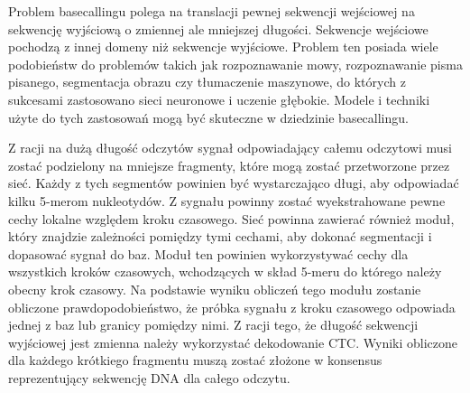\documentclass[a4paper,11pt,twoside]{report}
\theoremstyle{definition}
\begin{document}
Problem basecallingu polega na translacji pewnej sekwencji wejściowej na sekwencję wyjściową o zmiennej ale mniejszej długości. Sekwencje wejściowe pochodzą z innej domeny niż sekwencje wyjściowe. Problem ten posiada wiele podobieństw do problemów takich jak rozpoznawanie mowy, rozpoznawanie pisma pisanego, segmentacja obrazu czy tłumaczenie maszynowe, do których z sukcesami zastosowano sieci neuronowe i uczenie głębokie. Modele i techniki użyte do tych zastosowań mogą być skuteczne w dziedzinie basecallingu.

Z racji na dużą długość odczytów sygnał odpowiadający całemu odczytowi musi zostać podzielony na mniejsze fragmenty, które mogą zostać przetworzone przez sieć. Każdy z tych segmentów powinien być wystarczająco długi, aby odpowiadać kilku 5-merom nukleotydów. Z sygnału powinny zostać wyekstrahowane pewne cechy lokalne względem kroku czasowego. Sieć powinna zawierać również moduł, który znajdzie zależności pomiędzy tymi cechami, aby dokonać segmentacji i dopasować sygnał do baz. Moduł ten powinien wykorzystywać cechy dla wszystkich kroków czasowych, wchodzących w skład 5-meru do którego należy obecny krok czasowy. Na podstawie wyniku obliczeń tego modułu zostanie obliczone prawdopodobieństwo, że próbka sygnału z kroku czasowego odpowiada jednej z baz lub granicy pomiędzy nimi. Z racji tego, że długość sekwencji wyjściowej jest zmienna należy wykorzystać dekodowanie CTC\cite{ctc}. Wyniki obliczone dla każdego krótkiego fragmentu muszą zostać złożone w konsensus reprezentujący sekwencję DNA dla całego odczytu.
\end{document}
